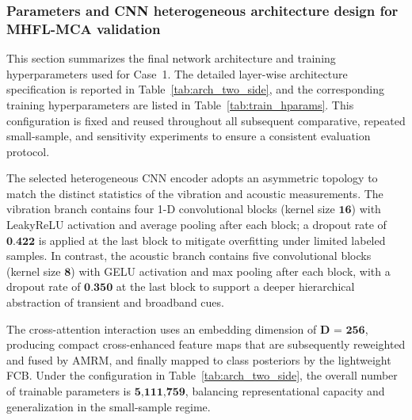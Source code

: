 \documentclass[a4paper]{cas-sc}
\begin{document}
\subsubsection{Parameters and CNN heterogeneous architecture design for MHFL-MCA validation}
\label{subsubsec:params_case1}

This section summarizes the final network architecture and training hyperparameters used for Case~1.
The detailed layer-wise architecture specification is reported in Table~\ref{tab:arch_two_side}, and the
corresponding training hyperparameters are listed in Table~\ref{tab:train_hparams}. This configuration is
fixed and reused throughout all subsequent comparative, repeated small-sample, and sensitivity experiments to ensure a consistent evaluation protocol.

The selected heterogeneous CNN encoder adopts an asymmetric topology to match the distinct statistics of the
vibration and acoustic measurements. The vibration branch contains four 1-D convolutional blocks (kernel
size $\textbf{16}$) with LeakyReLU activation and average pooling after each block; a dropout rate of $\textbf{0.422}$ is
applied at the last block to mitigate overfitting under limited labeled samples. In contrast, the acoustic
branch contains five convolutional blocks (kernel size $\textbf{8}$) with GELU activation and max pooling after each
block, with a dropout rate of $\textbf{0.350}$ at the last block to support a deeper hierarchical abstraction of
transient and broadband cues.

The cross-attention interaction uses an embedding dimension of $\textbf{D = 256}$, producing compact cross-enhanced
feature maps that are subsequently reweighted and fused by AMRM, and finally mapped to class
posteriors by the lightweight FCB. Under the configuration in Table~\ref{tab:arch_two_side}, the overall
number of trainable parameters is $\textbf{5{,}111{,}759}$, balancing representational capacity and generalization in
the small-sample regime.
\end{document}
